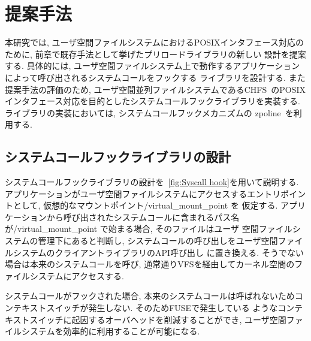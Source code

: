 \documentclass[a4paper,11pt]{jreport}
\begin{document}
\chapter{提案手法}
本研究では, ユーザ空間ファイルシステムにおけるPOSIXインタフェース対応のために, 前章で既存手法として挙げたプリロードライブラリの新しい
設計を提案する. 具体的には, ユーザ空間ファイルシステム上で動作するアプリケーションによって呼び出されるシステムコールをフックする
ライブラリを設計する. また提案手法の評価のため, ユーザ空間並列ファイルシステムであるCHFS~\cite{tatebe2022chfs}のPOSIX
インタフェース対応を目的としたシステムコールフックライブラリを実装する. ライブラリの実装においては, システムコールフックメカニズムの
zpoline~\cite{288689}を利用する.


\section{システムコールフックライブラリの設計}
システムコールフックライブラリの設計を\figurename~\ref{fig:Syscall hook}を用いて説明する.
アプリケーションがユーザ空間ファイルシステムにアクセスするエントリポイントとして, 仮想的なマウントポイント/virtual\_mount\_point を
仮定する. アプリケーションから呼び出されたシステムコールに含まれるパス名が/virtual\_mount\_point で始まる場合, そのファイルはユーザ
空間ファイルシステムの管理下にあると判断し, システムコールの呼び出しをユーザ空間ファイルシステムのクライアントライブラリのAPI呼び出し
に置き換える. そうでない場合は本来のシステムコールを呼び, 通常通りVFSを経由してカーネル空間のファイルシステムにアクセスする.

システムコールがフックされた場合, 本来のシステムコールは呼ばれないためコンテキストスイッチが発生しない. そのためFUSEで発生している
ようなコンテキストスイッチに起因するオーバヘッドを削減することができ, ユーザ空間ファイルシステムを効率的に利用することが可能になる.
\end{document}
